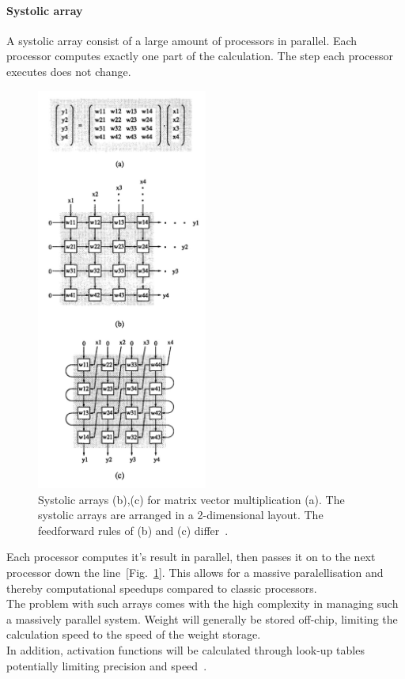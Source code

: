 \documentclass[conference]{IEEEtran}
\begin{document}
    \paragraph{Systolic array}


    A systolic array consist of a large amount of processors in parallel.
    Each processor computes exactly one part of the calculation.
    The step each processor executes does not change.

    \begin{figure}
        \centering
        \includegraphics[width=0.5\textwidth]{resources/sysarray.jpg}
        \caption{Systolic arrays (b),(c) for matrix vector multiplication (a).
        The systolic arrays are arranged in a 2-dimensional layout.
        The feedforward rules of (b) and (c) differ~\cite[Fig.~2]{chung1992systolic}.}
        \label{fig:sysarray}
    \end{figure}

    Each processor computes it's result in parallel, then passes it on to the next processor down the line~[Fig.~\ref{fig:sysarray}].
    This allows for a massive paralellisation and thereby computational speedups compared to classic processors. \\
    The problem with such arrays comes with the high complexity in managing such a massively parallel system.
    Weight will generally be stored off-chip, limiting the calculation speed to the speed of the weight storage.\\
    In addition, activation functions will be calculated through look-up tables potentially limiting precision and speed~\cite{dias2004artificial}.
\end{document}
